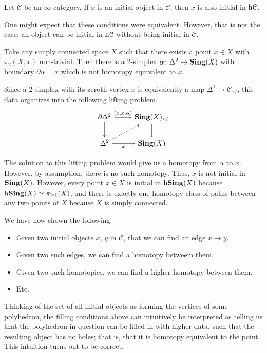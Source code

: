 \documentclass[main.tex]{subfiles}
\begin{document}
\begin{corollary}
  Let $\mathcal{C}$ be an $\infty$-category. If $x$ is an initial object in $\mathcal{C}$, then $x$ is also initial in $\mathrm{h}\mathcal{C}$.
\end{corollary}

One might expect that these conditions were equivalent. However, that is not the case; an object can be initial in $\mathrm{h} \mathcal{C}$ without being initial in $\mathcal{C}$.

\begin{example}
  Take any simply connected space $X$ such that there exists a point $x \in X$ with $\pi_{2}(X, x)$ non-trivial. Then there is a 2-simplex $\alpha\colon \Delta^{2} \to \mathbf{Sing}(X)$ with boundary $\partial \alpha = x$ which is not homotopy equivalent to $x$.

  Since a 2-simplex with its zeroth vertex $x$ is equivalently a map $\Delta^{1} \to \mathcal{C}_{x/}$, this data organizes into the following lifting problem.
  \begin{equation*}
    \begin{tikzcd}
      \partial \Delta^{2}
      \arrow[r, "{(x,x,\alpha)}"]
      \arrow[d]
      & \Sing(X)_{x/}
      \arrow[d]
      \\
      \Delta^{2}
      \arrow[ur, dashed]
      \arrow[r, swap, "x"]
      & \Sing(X)
    \end{tikzcd}
  \end{equation*}

  The solution to this lifting problem would give us a homotopy from $\alpha$ to $x$. However, by assumption, there is no such homotopy. Thus, $x$ is not initial in $\mathbf{Sing}(X)$. However, every point $x \in X$ is initial in $\mathrm{h} \mathbf{Sing}(X)$ because $\mathrm{h} \mathbf{Sing}(X) \simeq \pi_{\geq 1}(X)$, and there is exactly one homotopy class of paths between any two points of $X$ because $X$ is simply connected.
\end{example}

We have now shown the following. 
\begin{itemize}
  \item Given two initial objects $x$, $y$ in $\mathcal{C}$, that we can find an edge $x \to y$. 
    
  \item Given two such edges, we can find a homotopy betweem them.

  \item Given two such homotopies, we can find a higher homotopy between them. 

  \item Etc. 
\end{itemize}
Thinking of the set of all initial objects as forming the vertices of some polyhedron, the filling conditions above can intuitively be interpreted as telling us that the polyhedron in question can be filled in with higher data, such that the resulting object has no holes; that is, that it is homotopy equivalent to the point. This intuition turns out to be correct.
\end{document}

